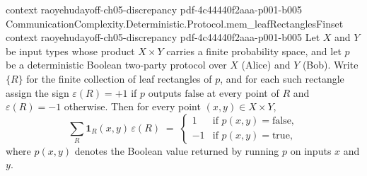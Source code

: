 \begin{lemma}
  {context}
  {raoyehudayoff-ch05-discrepancy}
  {pdf-4c44440f2aaa-p001-b005}
\proofstep
  {CommunicationComplexity.Deterministic.Protocol.mem_leafRectanglesFinset}
  {context}
  {raoyehudayoff-ch05-discrepancy}
  {pdf-4c44440f2aaa-p001-b005}
Let $X$ and $Y$ be input types whose product $X \times Y$ carries a finite probability
space, and let $p$ be a deterministic Boolean two-party protocol over $X$ (Alice) and
$Y$ (Bob). Write $\{R\}$ for the finite collection of leaf rectangles of $p$, and for
each such rectangle assign the sign $\varepsilon(R) = +1$ if $p$ outputs
$\mathrm{false}$ at every point of $R$ and $\varepsilon(R) = -1$ otherwise. Then for
every point $(x,y) \in X \times Y$,
\[
\sum_{R} \mathbf{1}_R(x,y)\,\varepsilon(R) \;=\; \begin{cases} 1 & \text{if } p(x,y) =
\mathrm{false},\\ -1 & \text{if } p(x,y) = \mathrm{true},\end{cases}
\]
where $p(x,y)$ denotes the Boolean value returned by running $p$ on inputs $x$ and $y$.
\end{lemma}

